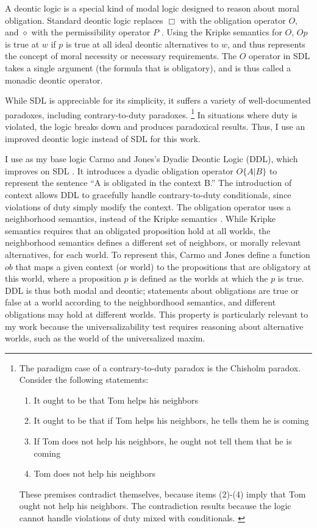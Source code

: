 \begin{isabellebody}
\begin{isamarkuptext}
A deontic logic is a special kind of modal logic designed to reason about moral obligation. Standard deontic
logic replaces $\Box$ with the obligation operator
$O$, and $\diamond$ with the permissibility operator $P$ \citep{cresswell}. Using the Kripke semantics for $O$, $O p$ 
is true at $w$ if $p$ is true at all  ideal deontic alternatives to $w$, and thus represents the 
concept of moral necessity or necessary requirements. The $O$ operator in SDL
takes a single argument (the formula that is obligatory), and is thus called a monadic deontic operator.

 While SDL is appreciable for its simplicity, it suffers a variety of well-documented paradoxes, 
including contrary-to-duty paradoxes. \footnote{The paradigm case of a contrary-to-duty paradox is the 
Chisholm paradox. Consider the following statements: \begin{enumerate}
\item It ought to be that Tom helps his neighbors
\item It ought to be that if Tom helps his neighbors, he tells them he is coming
\item If Tom does not help his neighbors, he ought not tell them that he is coming
\item Tom does not help his neighbors
\end{enumerate} 
These premises contradict themselves, because items (2)-(4) imply that Tom ought not help his neighbors. The 
contradiction results because the logic cannot handle violations of duty mixed with
conditionals. \citep{chisholm, ctd}
} In situations where duty is violated, the logic breaks down 
and produces paradoxical results. Thus, I use an improved deontic logic instead of SDL for this work.

I use as my base logic Carmo and Jones's Dyadic Deontic Logic (DDL), which improves on SDL \citep{CJDDL}. 
It introduces a dyadic obligation operator $O\{A \vert B\}$ 
to represent the sentence ``A is obligated in the context B.'' The introduction of context allows DDL to
gracefully handle contrary-to-duty conditionals, since violations of duty simply modify the context. The obligation operator uses 
a neighborhood semantics, instead of the Kripke semantics \citep{neighborhood1, neighborhood2}. While Kripke
semantics requires that an obligated proposition hold at all worlds, the neighborhood semantics defines
a different set of neighbors, or morally relevant alternatives, for each world. To represent this,
Carmo and Jones define a function $ob$ that maps a given context (or world) to the propositions 
that are obligatory at this world, where a proposition $p$ is defined as 
the worlds at which the $p$ is true. DDL is thus both modal and deontic; statements about obligations are
true or false at a world according to the neighbordhood 
semantics, and different obligations may hold at different worlds. This property is particularly relevant to my work because the universalizability test
requires reasoning about alternative worlds, such as the world of the universalized maxim.


\end{isamarkuptext}
\end{isabellebody}

